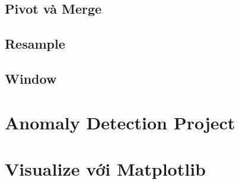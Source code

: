 \documentclass[
]{book}
\begin{document}
\hypertarget{pivot-vuxe0-merge}{%
\section{Pivot và Merge}\label{pivot-vuxe0-merge}}

\hypertarget{resample}{%
\section{Resample}\label{resample}}

\hypertarget{window}{%
\section{Window}\label{window}}

\hypertarget{anomaly-detection-project}{%
\chapter{Anomaly Detection Project}\label{anomaly-detection-project}}

\hypertarget{visualize-vux1edbi-matplotlib}{%
\chapter{Visualize với Matplotlib}\label{visualize-vux1edbi-matplotlib}}

\printindex
\end{document}
